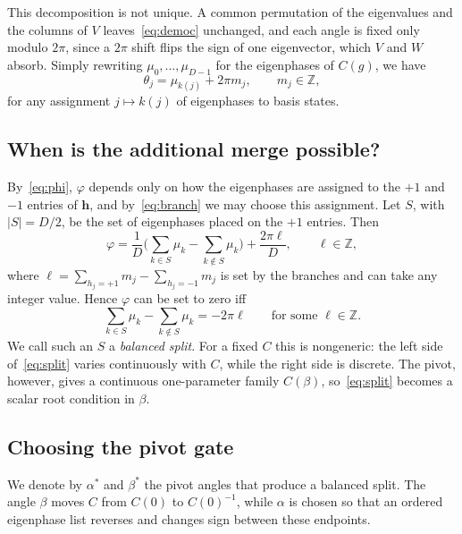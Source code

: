 \documentclass[11pt]{article}
\begin{document}
This decomposition is not unique. A common permutation of the eigenvalues and the columns of $V$
leaves~\eqref{eq:democ} unchanged, and each angle is fixed only modulo $2\pi$, since a $2\pi$ shift
flips the sign of one eigenvector, which $V$ and $W$ absorb. Simply rewriting $\mu_0,\dots,\mu_{D-1}$ for the
eigenphases of $C(g)$, we have
\begin{equation}\label{eq:branch}
\theta_j=\mu_{k(j)}+2\pi m_j,\qquad m_j\in\mathbb Z,
\end{equation}
for any assignment $j\mapsto k(j)$ of eigenphases to basis states.

\subsection{When is the additional merge possible?}\label{sec:cond}

By~\eqref{eq:phi}, $\varphi$ depends only on how the eigenphases are assigned to the $+1$
and $-1$ entries of $\mathbf h$, and by~\eqref{eq:branch} we may choose this assignment. Let $S$,
with $|S|=D/2$, be the set of eigenphases placed on the $+1$ entries. Then
\begin{equation}\label{eq:phiS}
\varphi=\frac1D\Big(\sum_{k\in S}\mu_k-\sum_{k\notin S}\mu_k\Big)+\frac{2\pi\ell}{D},\qquad
\ell\in\mathbb Z,
\end{equation}
where $\ell=\sum_{h_j=+1}m_j-\sum_{h_j=-1}m_j$ is set by the branches and can take any integer
value. Hence $\varphi$ can
be set to zero iff
\begin{equation}\label{eq:split}
\sum_{k\in S}\mu_k-\sum_{k\notin S}\mu_k=-2\pi\ell\qquad\text{for some }\ell\in\mathbb Z .
\end{equation}
We call such an $S$ a \emph{balanced split}. For a fixed $C$ this is nongeneric: the left side of~\eqref{eq:split}
varies continuously with $C$, while the right side is discrete. The pivot, however, gives a
continuous one-parameter family $C(\beta)$, so~\eqref{eq:split} becomes a scalar root condition
in $\beta$.
\subsection{Choosing the pivot gate}\label{sec:exist}

We denote by $\alpha^{*}$ and $\beta^{*}$ the pivot angles that produce a balanced split. The angle
$\beta$ moves $C$ from $C(0)$ to $C(0)^{-1}$, while $\alpha$ is chosen so that an ordered
eigenphase list reverses and changes sign between these endpoints.
\end{document}
